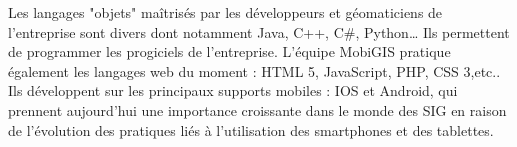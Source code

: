 Les langages "objets" maîtrisés par les développeurs et géomaticiens de l'entreprise sont divers dont notamment Java, C++, C#, Python… Ils permettent de programmer les progiciels de l'entreprise. L'équipe MobiGIS pratique également les langages web du moment : HTML 5, JavaScript, PHP, CSS 3,etc.. Ils développent sur les principaux supports mobiles : IOS et Android, qui prennent aujourd'hui une importance croissante dans le monde des SIG en raison de l'évolution des pratiques liés à l'utilisation des smartphones et des tablettes. \\